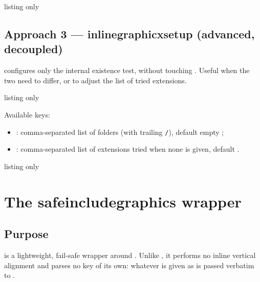\documentclass[11pt,a4paper]{ltxdoc}
\begin{document}
\begin{DemoCode}{listing only}
\usepackage{inlinegraphicx}
\end{DemoCode}

\subsection{Approach 3 --- inlinegraphicxsetup (advanced, decoupled)}

\ShowCode{\\inlinegraphicxsetup} configures only the internal existence test, without touching \ShowCode{\\graphicspath}. Useful when the two need to differ, or to adjust the list of tried extensions.

\begin{DemoCode}{listing only}
\end{DemoCode}

Available keys:

\begin{itemize}
  \item {}: comma-separated list of folders (with trailing \texttt{/}), default empty ;
  \item {}: comma-separated list of extensions tried when none is given, default .
\end{itemize}

\begin{DemoCode}{listing only}
\usepackage[inherit=false]{inlinegraphicx}
\graphicspath{{figures/}}

\end{DemoCode}

\pagebreak

\section{The safeincludegraphics wrapper}

\subsection{Purpose}

\ShowCode{\\safeincludegraphics} is a lightweight, fail-safe wrapper around . Unlike \ShowCode{\\inlinegraphics}, it performs no inline vertical alignment and parses no key of its own: whatever is given as \ShowCode{[options]} is passed verbatim to .
\end{document}
